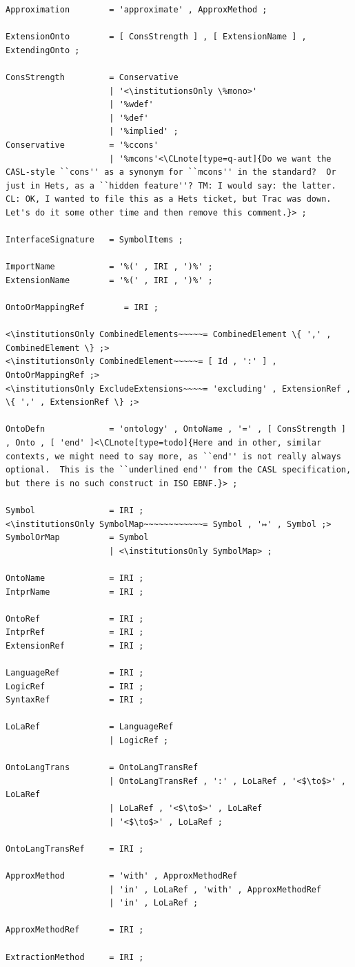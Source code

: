 \documentclass[10pt,%
\ifpretendfinal
final%
\else
draft%
\fi,
]{scrreprt}
\makeatletter
\newcommand*\CommentAuthor{}
\renewcommand*\CommentAuthor{#1}}
\newcommand*\CommentDate{}
\renewcommand*\CommentDate{#1}}
\newcommand*\CommentId{}
\renewcommand*\CommentId{#1}}
\newcommand*\CommentType{}
\renewcommand*\CommentType{#1}}
\newcommand*{\SetCommentColorByType}[1]{%
\edef\localType{{#1}}%
\expandafter\ifstrequal\localType{q-aut}{\colorlet{CommentColor}{red}}{%
\expandafter\ifstrequal\localType{q-all}{\colorlet{CommentColor}{orange}}{%
\expandafter\ifstrequal\localType{todo}{\colorlet{CommentColor}{orange}}{%
\expandafter\ifstrequal\localType{fyi}{\colorlet{CommentColor}{lightgray}}{%
\colorlet{CommentColor}{yellow}}}}}}
\newcommand*{\SetCommentPrefixByType}[1]{%
\edef\localType{{#1}}%
\expandafter\@ifmtarg\localType{%
\edef\CommentPrefix{}%
}{%
\caseupper[q]{#1}%
\edef\CommentPrefix{\thestring: }%
}}
\newcommand*{\initComment}[1]{%
\setkeys{Comment}{#1}%
\SetCommentColorByType{\CommentType}%
\relax%
\SetCommentPrefixByType{\CommentType}%
\relax%
}
\newcommand*{\todonote}[2][]{%
\initComment{#1}%
\pdfcomment[author=\CommentAuthor,color=CommentColor,date=\CommentDate,id=\CommentId]{%
\CommentPrefix
#2}}
\renewcommand*{\todonote}[2][]{%
\initComment{#1}%
\ednote{\CommentPrefix #2}}
\newcommand*{\CLnote}[2][author=Christoph Lange]{%
\todonote[author=Christoph Lange,#1]{#2} 
}
\newcommand*{\institutionsOnly}{\bfseries\itshape}
\makeatother
\begin{document}
\begin{lstlisting}[language=ebnf,escapeinside={<>}]
Approximation        = 'approximate' , ApproxMethod ;

ExtensionOnto        = [ ConsStrength ] , [ ExtensionName ] , ExtendingOnto ;

ConsStrength         = Conservative
                     | '<\institutionsOnly \%mono>'
                     | '%wdef'
                     | '%def'
                     | '%implied' ;
Conservative         = '%ccons'
                     | '%mcons'<\CLnote[type=q-aut]{Do we want the CASL-style ``cons'' as a synonym for ``mcons'' in the standard?  Or just in Hets, as a ``hidden feature''? TM: I would say: the latter. CL: OK, I wanted to file this as a Hets ticket, but Trac was down.  Let's do it some other time and then remove this comment.}> ;

InterfaceSignature   = SymbolItems ;

ImportName           = '%(' , IRI , ')%' ;
ExtensionName        = '%(' , IRI , ')%' ;

OntoOrMappingRef        = IRI ;

<\institutionsOnly CombinedElements~~~~~= CombinedElement \{ ',' , CombinedElement \} ;>
<\institutionsOnly CombinedElement~~~~~= [ Id , ':' ] , OntoOrMappingRef ;>
<\institutionsOnly ExcludeExtensions~~~~= 'excluding' , ExtensionRef , \{ ',' , ExtensionRef \} ;>

OntoDefn             = 'ontology' , OntoName , '=' , [ ConsStrength ] , Onto , [ 'end' ]<\CLnote[type=todo]{Here and in other, similar contexts, we might need to say more, as ``end'' is not really always optional.  This is the ``underlined end'' from the CASL specification, but there is no such construct in ISO EBNF.}> ;

Symbol               = IRI ;
<\institutionsOnly SymbolMap~~~~~~~~~~~~= Symbol , '↦' , Symbol ;>
SymbolOrMap          = Symbol
                     | <\institutionsOnly SymbolMap> ;

OntoName             = IRI ;
IntprName            = IRI ;

OntoRef              = IRI ;
IntprRef             = IRI ;
ExtensionRef         = IRI ;

LanguageRef          = IRI ;
LogicRef             = IRI ;
SyntaxRef            = IRI ;

LoLaRef              = LanguageRef
                     | LogicRef ;

OntoLangTrans        = OntoLangTransRef
                     | OntoLangTransRef , ':' , LoLaRef , '<$\to$>' , LoLaRef
                     | LoLaRef , '<$\to$>' , LoLaRef
                     | '<$\to$>' , LoLaRef ;

OntoLangTransRef     = IRI ;

ApproxMethod         = 'with' , ApproxMethodRef
                     | 'in' , LoLaRef , 'with' , ApproxMethodRef
                     | 'in' , LoLaRef ;

ApproxMethodRef      = IRI ;

ExtractionMethod     = IRI ;

\end{lstlisting}
\end{document}
